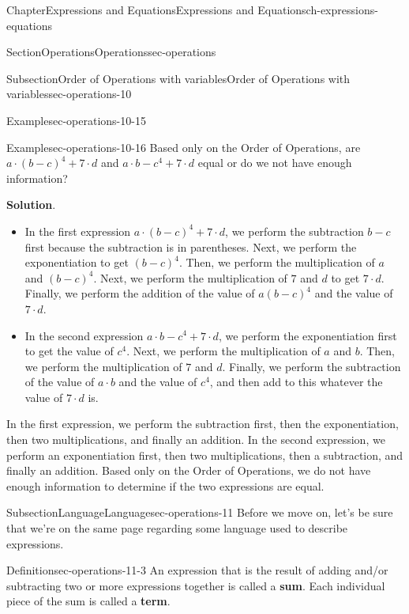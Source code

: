 \documentclass[twoside,11pt,]{book}
\newcommand{\blocktitlefont}{\relax}
\newcommand{\terminology}[1]{\textbf{#1}}
\numberwithin{equation}{chapter}
\begin{document}
\begin{chapterptx}{Chapter}{Expressions and Equations}{}{Expressions and Equations}{}{}{ch-expressions-equations}
\begin{sectionptx}{Section}{Operations}{}{Operations}{}{}{sec-operations}
\begin{subsectionptx}{Subsection}{Order of Operations with variables}{}{Order of Operations with variables}{}{}{sec-operations-10}
\begin{example}{Example}{}{sec-operations-10-15}
\end{example}
\begin{example}{Example}{}{sec-operations-10-16}%
Based only on the Order of Operations, are \(a \cdot (b-c)^4+7 \cdot d\) and \(a \cdot b - c^4 + 7 \cdot d\) equal or do we not have enough information?%
\par\smallskip%
\noindent\textbf{\blocktitlefont Solution}.\hypertarget{sec-operations-10-16-2}{}\quad{}%
\begin{itemize}[label=\textbullet]
\item{}In the first expression \(a \cdot (b-c)^4+7 \cdot d\), we perform the subtraction \(b-c\) first because the subtraction is in parentheses. Next, we perform the exponentiation to get \((b-c)^4\). Then, we perform the multiplication of \(a\) and \((b-c)^4\). Next, we perform the multiplication of \(7\) and \(d\) to get \(7 \cdot d\). Finally, we perform the addition of the value of \(a(b-c)^4\) and the value of \(7 \cdot d\).%
\item{}In the second expression \(a \cdot b - c^4 + 7 \cdot d\), we perform the exponentiation first to get the value of \(c^4\). Next, we perform the multiplication of \(a\) and \(b\). Then, we perform the multiplication of \(7\) and \(d\). Finally, we perform the subtraction of the value of \(a \cdot b\) and the value of \(c^4\), and then add to this whatever the value of \(7 \cdot d\) is.%
\end{itemize}
In the first expression, we perform the subtraction first, then the exponentiation, then two multiplications, and finally an addition. In the second expression, we perform an exponentiation first, then two multiplications, then a subtraction, and finally an addition. Based only on the Order of Operations, we do not have enough information to determine if the two expressions are equal.%
\end{example}
\end{subsectionptx}
%
%
\typeout{************************************************}
\typeout{************************************************}
%
\begin{subsectionptx}{Subsection}{Language}{}{Language}{}{}{sec-operations-11}
Before we move on, let's be sure that we're on the same page regarding some language used to describe expressions.%
\begin{definition}{Definition}{}{sec-operations-11-3}%
An expression that is the result of adding and\slash{}or subtracting two or more expressions together is called a \terminology{sum}. Each individual piece of the sum is called a \terminology{term}.%

\end{definition}
\end{subsectionptx}
\end{sectionptx}
\end{chapterptx}
\end{document}
